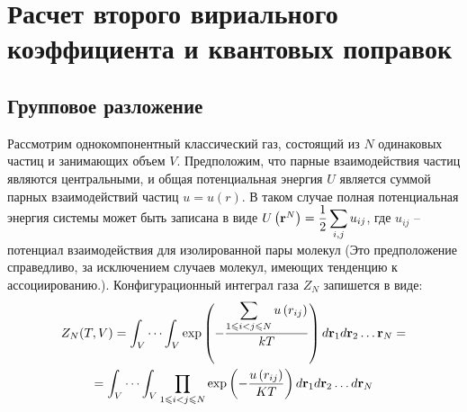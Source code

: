 \section{Расчет второго вириального коэффициента и квантовых поправок}

\subsection{Групповое разложение \cite{eremin, hirsch}}

Рассмотрим однокомпонентный классический газ, состоящий из $N$ одинаковых частиц и занимающих объем $V$. Предположим, что парные взаимодействия частиц являются центральными, и общая потенциальная энергия $U$ является суммой парных взаимодействий частиц $u = u(r)$. В таком случае полная потенциальная энергия системы может быть записана в виде $U \left( \mathbf{r}^N \right) = \displaystyle \dfrac{1}{2} \sum_{i, j} u_{ij}$, где $u_{ij}$ -- потенциал взаимодействия для изолированной пары молекул (Это предположение справедливо, за исключением случаев молекул, имеющих тенденцию к ассоциированию.). Конфигурационный интеграл газа $Z_N$ запишется в виде:
\vverh
\begin{gather}
	Z_N (T, V) = \int_V \cdots \int_V \exp \left( - \frac{\displaystyle\sum_{1 \leqslant i < j \leqslant N} u \left( r_{ij} \right)}{kT} \right) d \mathbf{r}_1 d \mathbf{r}_2 \dots \mathbf{r}_N = \notag \\
	= \int_V \cdots \int_V \prod_{1 \leqslant i < j \leqslant N} \exp \left( - \frac{u \left( r_{ij} \right)}{KT} \right) d \mathbf{r}_1 d \mathbf{r}_2 \dots d \mathbf{r}_N \label{confint}
\end{gather}


